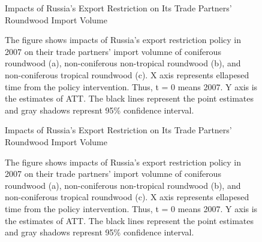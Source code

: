 \documentclass[a4paper,12pt]{article}
\begin{document}
\begin{figure}[H] 
    \centering
    \caption{Impacts of Russia's Export Restriction on Its Trade Partners' Roundwood Import Volume}
    \caption*{\small{The figure shows impacts of Russia's export restriction policy in 2007 on their trade partners' import volumne of coniferous roundwood (a), non-coniferous non-tropical roundwood (b), and non-coniferous tropical roundwood (c). X axis represents ellapesed time from the policy intervention. Thus, t = 0 means 2007. Y axis is the estimates of ATT. The black lines represent the point estimates and gray shadows represnt 95\% confidence interval.}}
    \label{fig:competitor_prod_Russia}
\end{figure}


\begin{figure}[H] 
    \centering
    \caption{Impacts of Russia's Export Restriction on Its Trade Partners' Roundwood Import Volume}
    \caption*{\small{The figure shows impacts of Russia's export restriction policy in 2007 on their trade partners' import volumne of coniferous roundwood (a), non-coniferous non-tropical roundwood (b), and non-coniferous tropical roundwood (c). X axis represents ellapesed time from the policy intervention. Thus, t = 0 means 2007. Y axis is the estimates of ATT. The black lines represent the point estimates and gray shadows represnt 95\% confidence interval.}}
    \label{fig:competitor_exp_Myanmar}
\end{figure}
\end{document}
